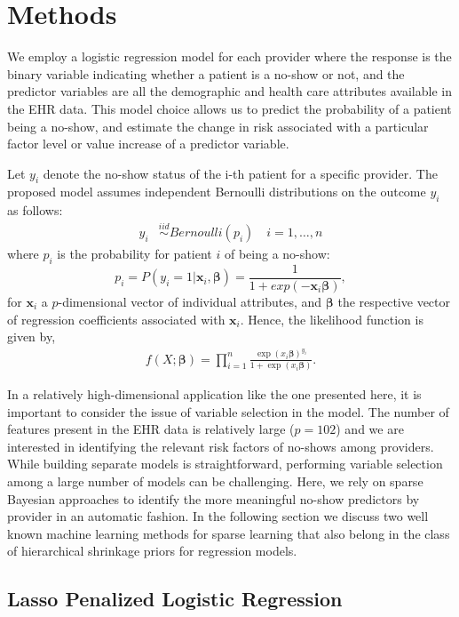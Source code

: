 \documentclass[twoside,11pt]{article}
\newcommand{\bx}{\boldsymbol{x}}
\newcommand{\bbeta}{\boldsymbol{\beta}}
\begin{document}
\section{Methods}

We employ a logistic regression model for each provider where the response is the binary variable indicating whether a patient is a no-show or not, and the predictor variables are all the demographic and health care attributes available in the EHR data. This model choice allows us to predict the probability of a patient being a no-show, and estimate the change in risk associated with a particular factor level or value increase of a predictor variable.

Let $y_{i}$ denote the no-show status of the i-th patient for a specific provider. The proposed model assumes independent Bernoulli distributions on the outcome $y_i$ as follows:
\begin{align}
y_{i} & \stackrel{iid}{\sim} Bernoulli (p_{i}) \quad i=1,\ldots,n
\end{align}
where $p_{i}$ is the probability for patient $i$ of being a no-show:
\begin{equation}
p_{i} = P(y_i=1|\bx_i,\bbeta)=\frac{1}{1 + exp(-\bx_i\bbeta)},
\end{equation}
for $\bx_{i}$ a $p$-dimensional vector of individual attributes, and $\bbeta$ the respective vector of regression coefficients associated with $\bx_{i}$. Hence, the likelihood function is given by, 
\begin{eqnarray} \label{eq:lik}
f(X;\bbeta) = \prod_{i=1}^n\frac{\exp(x_i\bbeta)^{y_i}}{1+\exp(x_i\bbeta)}.
\end{eqnarray}

In a relatively high-dimensional application like the one presented here, it is important to consider the issue of variable selection in the model. The number of features present in the EHR data is relatively large ($p=102$) and we are interested in identifying the relevant risk factors of no-shows among providers. While building separate models is straightforward, performing variable selection among a large number of models can be challenging. Here, we rely on sparse Bayesian approaches to identify the more meaningful no-show predictors by provider in an automatic fashion. In the following section we discuss two well known machine learning methods for sparse learning that also belong in the class of
hierarchical shrinkage priors for regression models.   

\subsection{Lasso Penalized Logistic Regression}
\end{document}
